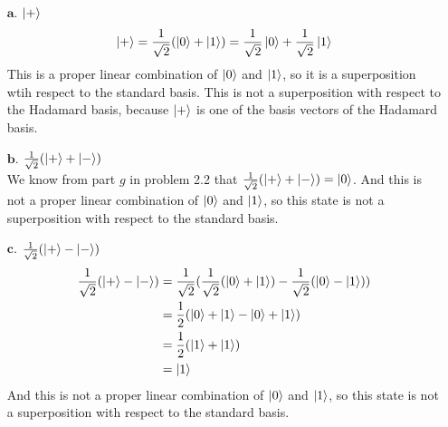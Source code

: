 \documentclass[11pt]{article}
\def\srtt{\ensuremath\frac{1}{\sqrt{2}}}
\begin{document}
\begin{enumerate}
\item[$\textbf{a.}$] $\ket{+}$ \\
	$$\ket{+} = \srtt(\ket{0} + \ket{1}) = \srtt\ket{0} + \srtt\ket{1}$$
	This is a proper linear combination of $\ket{0}$ and $\ket{1}$, so it is a superposition wtih respect to the standard basis.
	This is not a superposition with respect to the Hadamard basis, because $\ket{+}$ is one of the basis vectors of the Hadamard basis. 

\item[$\textbf{b.}$] $\srtt(\ket{+} + \ket{-})$ \\
	We know from part $g$ in problem 2.2 that $\srtt(\ket{+} + \ket{-}) = \ket{0}$.
		And this is not a proper linear combination of $\ket{0}$ and $\ket{1}$,
		so this state is not a superposition with respect to the standard basis.

\item[$\textbf{c.}$] $\srtt(\ket{+} - \ket{-})$
	\begin{align*}
		\srtt(\ket{+} - \ket{-}) 
		&= \srtt(\srtt(\ket{0} + \ket{1}) - \srtt(\ket{0} - \ket{1})) \\
		&= \frac{1}{2}(\ket{0} + \ket{1} - \ket{0} + \ket{1}) \\
		&= \frac{1}{2}(\ket{1} + \ket{1}) \\
		&= \ket{1}
	\end{align*}
	And this is not a proper linear combination of $\ket{0}$ and $\ket{1}$,
	so this state is not a superposition with respect to the standard basis.


\end{enumerate}
\end{document}
